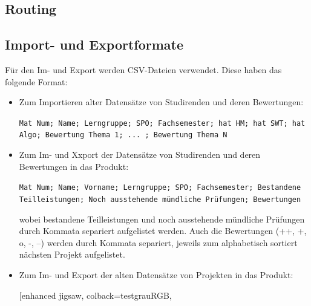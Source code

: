 \documentclass[parskip=full]{scrartcl}
\begin{document}
\subsection{Routing}


\subsection{Import- und Exportformate}
Für den Im- und Export werden CSV-Dateien verwendet. Diese haben das folgende
Format: 
\begin{itemize}
  \item Zum Importieren alter Datensätze von Studirenden und deren Bewertungen:
 \\ \begin{tcolorbox}[enhanced jigsaw, %
 colback=testgrauRGB, %
 coltext=black, %
 sharp corners, %
 colframe=black, %
 boxrule=0pt %
 ]
 \texttt{Mat Num; Name; Lerngruppe; SPO;
  Fachsemester; hat HM; hat SWT; hat Algo; Bewertung Thema 1; ... ; Bewertung
  Thema N}
  \end{tcolorbox}
   \item Zum Im- und Xxport der Datensätze von Studirenden und deren
   Bewertungen in das Produkt: \\ \begin{tcolorbox}[enhanced jigsaw, %
 colback=testgrauRGB, %
 coltext=black, %
 sharp corners, %
 colframe=black, %
 boxrule=0pt %
 ]
 \texttt{Mat Num; Name; Vorname; Lerngruppe; SPO; Fachsemester; Bestandene
 Teilleistungen; Noch ausstehende mündliche Prüfungen; Bewertungen}
  \end{tcolorbox}
   wobei bestandene Teilleistungen und noch ausstehende mündliche Prüfungen durch
  Kommata separiert aufgelistet werden. Auch die Bewertungen (++, +, o, -, --)
  werden durch Kommata separiert, jeweils zum alphabetisch sortiert nächsten
  Projekt aufgelistet.
  \item Zum Im- und Export der alten Datensätze von Projekten in das Produkt:
  \\
  \begin{tcolorbox}[enhanced jigsaw, %
 colback=testgrauRGB, %

\end{tcolorbox}
\end{itemize}
\end{document}
